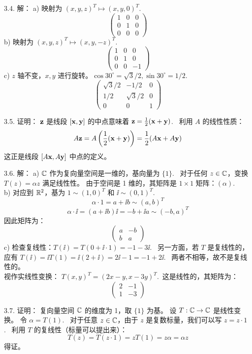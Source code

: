 \begin{exer}
3.4. 解：
a) 映射为 $(x, y, z)^T \mapsto (x, y, 0)^T$.~
$$ \begin{pmatrix} 1 & 0 & 0 \\ 0 & 1 & 0 \\ 0 & 0 & 0 \end{pmatrix} $$
b) 映射为 $(x, y, z)^T \mapsto (x, y, -z)^T$.~
$$ \begin{pmatrix} 1 & 0 & 0 \\ 0 & 1 & 0 \\ 0 & 0 & -1 \end{pmatrix} $$
c) $z$ 轴不变，$x, y$ 进行旋转。$\cos 30^\circ = \sqrt{3}/2, \sin 30^\circ = 1/2$.~
$$ \begin{pmatrix} \sqrt{3}/2 & -1/2 & 0 \\ 1/2 & \sqrt{3}/2 & 0 \\ 0 & 0 & 1 \end{pmatrix} $$

3.5. 证明：
$\mathbf{z}$ 是线段 $[\mathbf{x}, \mathbf{y}]$ 的中点意味着 $\mathbf{z} = \frac{1}{2}(\mathbf{x} + \mathbf{y})$.~
利用 $A$ 的线性性质：
$$ A\mathbf{z} = A\left(\frac{1}{2}(\mathbf{x} + \mathbf{y})\right) = \frac{1}{2}(A\mathbf{x} + A\mathbf{y}) $$
这正是线段 $[A \mathbf{x}, A \mathbf{y}]$ 中点的定义。

3.6. 解：
a) $\mathbb{C}$ 作为复向量空间是一维的，基向量为 $\{1\}$.~
对于任何 $z \in \mathbb{C}$，变换 $T(z) = \alpha z$ 满足线性性。
由于空间是 1 维的，其矩阵是 $1 \times 1$ 矩阵：$(\alpha)$.~
\\
b) 对应到 $\mathbb{R}^2$，基为 $1 \sim (1, 0)^T$ 和 $\ii \sim (0, 1)^T$.~
$$ \alpha \cdot 1 = a + \ii b \sim (a, b)^T $$
$$ \alpha \cdot \ii = (a + \ii b)\ii = -b + \ii a \sim (-b, a)^T $$
因此矩阵为：
$$ \begin{pmatrix} a & -b \\ b & a \end{pmatrix} $$
c) 检查复线性：$T(\ii) = T(0 + \ii \cdot 1) = -1 - 3\ii$.~
另一方面，若 $T$ 是复线性的，应有 $T(\ii) = \ii T(1) = \ii (2 + \ii) = 2\ii - 1 = -1 + 2\ii$.~
两者不相等，故不是复线性的。
\\
视作实线性变换：
$T(x, y)^T = (2x - y, x - 3y)^T$.~这是线性的，其矩阵为：
$$ \begin{pmatrix} 2 & -1 \\ 1 & -3 \end{pmatrix} $$

3.7. 证明：
复向量空间 $\mathbb{C}$ 的维度为 1，取 $\{1\}$ 为基。
设 $T: \mathbb{C} \to \mathbb{C}$ 是线性变换。
令 $\alpha = T(1)$.~
对于任意 $z \in \mathbb{C}$，由于 $z$ 是复数标量，我们可以写 $z = z \cdot 1$.~
利用 $T$ 的复线性（标量可以提出来）：
$$ T(z) = T(z \cdot 1) = z T(1) = z \alpha = \alpha z $$
得证。



\end{exer}
